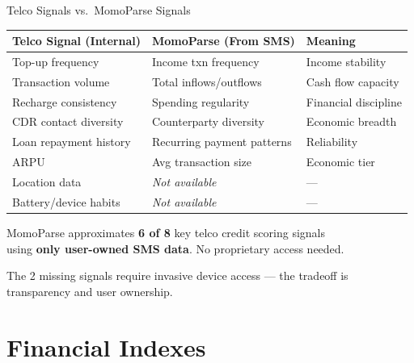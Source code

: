 \documentclass[aspectratio=169, 11pt]{beamer}
\begin{document}
\begin{frame}{Telco Signals vs.\ MomoParse Signals}
\centering
\small
\begin{tabular}{l l l}
\toprule
\textbf{Telco Signal (Internal)} & \textbf{MomoParse (From SMS)} & \textbf{Meaning} \\
\midrule
Top-up frequency       & Income txn frequency       & Income stability \\
Transaction volume     & Total inflows/outflows     & Cash flow capacity \\
Recharge consistency   & Spending regularity        & Financial discipline \\
CDR contact diversity  & Counterparty diversity     & Economic breadth \\
Loan repayment history & Recurring payment patterns & Reliability \\
ARPU                   & Avg transaction size       & Economic tier \\
\midrule
Location data          & \textcolor{mpRed}{\textit{Not available}}  & --- \\
Battery/device habits  & \textcolor{mpRed}{\textit{Not available}}  & --- \\
\bottomrule
\end{tabular}

\vspace{0.5cm}
MomoParse approximates \textbf{6 of 8} key telco credit scoring signals\\using \textbf{only user-owned SMS data}. No proprietary access needed.

\vspace{0.2cm}
\textcolor{mpGray}{\footnotesize The 2 missing signals require invasive device access --- the tradeoff is transparency and user ownership.}
\end{frame}

\section{Financial Indexes}
\end{document}
